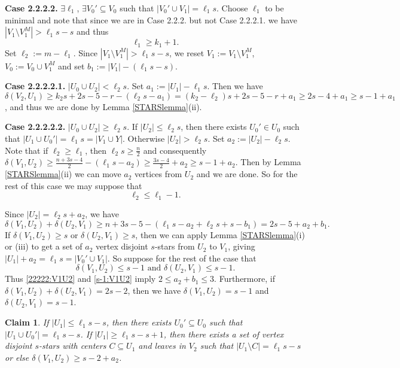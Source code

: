 \documentclass[oneside,12pt]{memoir}
\newtheorem{claim}[theorem]{Claim}
\begin{document}
\textbf{Case 2.2.2.2.} $\exists \ell_1$, $\exists V_0'\subseteq V_0$ such that $|V_0'\cup V_1|=\ell_1s$. Choose $\ell_1$ to be minimal and note that since we are in Case 2.2.2. but not Case 2.2.2.1. we have $|V_1\setminus V_1^M|> \ell_1s-s$ and thus
\begin{equation}
\ell_1\geq k_1+1.\label{l1k1}
\end{equation}
Set $\ell_2:=m-\ell_1$. Since $|V_1\setminus V_1^M|>\ell_1s-s$, we reset $V_1:=V_1\setminus V_1^M$, $V_0:=V_0\cup V_1^M$ and set $b_1:=|V_1|-(\ell_1s-s)$. 

\textbf{Case 2.2.2.2.1.} $|U_0\cup U_2|<\ell_2 s$.  Set $a_1:=|U_1|-\ell_1s$.  Then we have $\delta(V_2, U_1)\geq k_2s+2s-5-r-(\ell_2s-a_1)=(k_2-\ell_2)s+2s-5-r+a_1\geq 2s-4+a_1\geq s-1+a_1$, and thus we are done by Lemma \ref{STARSlemma}(ii).  

\textbf{Case 2.2.2.2.2.} $|U_0\cup U_2|\geq \ell_2 s$.  If $|U_2|\leq \ell_2s$, then there exists $U_0'\in U_0$ such that $|U_1\cup U_0'|=\ell_1s=|V_1\cup Y|$.  Otherwise $|U_2|>\ell_2s$.  Set $a_2:=|U_2|-\ell_2s$.  Note that if $\ell_2\geq \ell_1$, then $\ell_2s\geq \frac{n}{2}$ and consequently $\delta(V_1, U_2)\geq \frac{n+3s-4}{2}-(\ell_1s-a_2)\geq \frac{3s-4}{2}+a_2\geq s-1+a_2$.  Then by Lemma \ref{STARSlemma}(ii) we can move $a_2$ vertices from $U_2$ and we are done.  So for the rest of this case we may suppose that
\begin{equation}
\ell_2\leq \ell_1-1.\label{l2l1}
\end{equation}

Since $|U_2|=\ell_2s+a_2$, we have 
\begin{equation}\label{22222:V1U2}
\delta(V_1, U_2)+\delta(U_2, V_1)\geq n+3s-5-(\ell_1s-a_2+\ell_2s+s-b_1)=2s-5+a_2+b_1.  
\end{equation}
If $\delta(V_1, U_2)\geq s$ or $\delta(U_2, V_1)\geq s$, then we can apply Lemma \ref{STARSlemma}(i) or (iii) to get a set of $a_2$ vertex disjoint $s$-stars from $U_2$ to $V_1$, giving $|U_1|+a_2=\ell_1s=|V_0'\cup V_1|$. So suppose for the rest of the case that %
\begin{equation}\label{s-1:V1U2}
\delta(V_1, U_2)\leq s-1 \text{ and } \delta(U_2, V_1)\leq s-1.
\end{equation} 
Thus \eqref{22222:V1U2} and \eqref{s-1:V1U2} imply $2\leq a_2+b_1\leq 3$.  Furthermore, if $\delta(V_1, U_2)+\delta(U_2, V_1)= 2s-2$, then we have $\delta(V_1, U_2)= s-1$ and $\delta(U_2, V_1)= s-1$.  

\begin{claim}\label{Claim 22222}
If $|U_1|\leq \ell_1s-s$, then there exists $U_0'\subseteq U_0$ such that $|U_1\cup U_0'|=\ell_1s-s$.  If $|U_1|\geq \ell_1s-s+1$, then there exists a set of vertex disjoint $s$-stars with centers $C\subseteq U_1$ and leaves in $V_2$ such that $|U_1\setminus C|=\ell_1s-s$ or else $\delta(V_1, U_2)\geq s-2+a_2$.

\end{claim}
\end{document}
